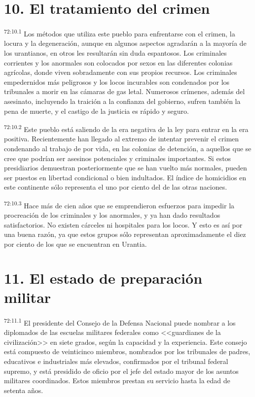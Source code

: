 \documentclass[twoside, 11pt]{book}
\begin{document}
\section*{10. El tratamiento del crimen}
\par
\textsuperscript{72:10.1} Los métodos que utiliza este pueblo para enfrentarse con el crimen, la locura y la degeneración, aunque en algunos aspectos agradarán a la mayoría de los urantianos, en otros les resultarán sin duda espantosos. Los criminales corrientes y los anormales son colocados por sexos en las diferentes colonias agrícolas, donde viven sobradamente con sus propios recursos. Los criminales empedernidos más peligrosos y los locos incurables son condenados por los tribunales a morir en las cámaras de gas letal. Numerosos crímenes, además del asesinato, incluyendo la traición a la confianza del gobierno, sufren también la pena de muerte, y el castigo de la justicia es rápido y seguro.

\par
\textsuperscript{72:10.2} Este pueblo está saliendo de la era negativa de la ley para entrar en la era positiva. Recientemente han llegado al extremo de intentar prevenir el crimen condenando al trabajo de por vida, en las colonias de detención, a aquellos que se cree que podrían ser asesinos potenciales y criminales importantes. Si estos presidiarios demuestran posteriormente que se han vuelto más normales, pueden ser puestos en libertad condicional o bien indultados. El índice de homicidios en este continente sólo representa el uno por ciento del de las otras naciones.

\par
\textsuperscript{72:10.3} Hace más de cien años que se emprendieron esfuerzos para impedir la procreación de los criminales y los anormales, y ya han dado resultados satisfactorios. No existen cárceles ni hospitales para los locos. Y esto es así por una buena razón, ya que estos grupos sólo representan aproximadamente el diez por ciento de los que se encuentran en Urantia.

\section*{11. El estado de preparación militar}
\par
\textsuperscript{72:11.1} El presidente del Consejo de la Defensa Nacional puede nombrar a los diplomados de las escuelas militares federales como <<guardianes de la civilización>> en siete grados, según la capacidad y la experiencia. Este consejo está compuesto de veinticinco miembros, nombrados por los tribunales de padres, educativos e industriales más elevados, confirmados por el tribunal federal supremo, y está presidido de oficio por el jefe del estado mayor de los asuntos militares coordinados. Estos miembros prestan su servicio hasta la edad de setenta años.
\end{document}
